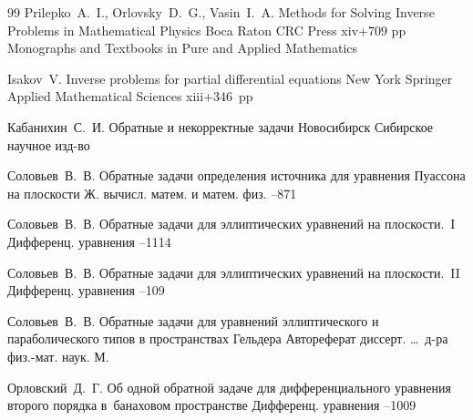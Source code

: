 \begin{thebibliography}{99}
\by  Prilepko~A.~I., Orlovsky~D.~G., Vasin~I.~A.
\book Methods for Solving Inverse Problems in Mathematical Physics
\publaddr Boca Raton 
\publ  CRC Press 
\totalpages xiv+709 pp \nofrills
\serial Monographs and Textbooks in Pure and Applied Mathematics

\by Isakov~V. 
\book Inverse problems for partial differential equations
\publaddr New York
\publ Springer
\serial Applied Mathematical Sciences
\totalpages xiii+346~pp \nofrills

\by Кабанихин~С.~И.
\book Обратные и некорректные задачи
\publaddr Новосибирск
\publ Сибирское научное изд-во

\by Соловьев~В.~В. 
\paper Обратные задачи определения источника для уравнения Пуассона на плоскости
\jour Ж. вычисл. матем. и матем. физ.
--871

\by Соловьев~В.~В. 
\paper Обратные задачи для эллиптических уравнений на плоскости.~I
\jour Дифференц. уравнения
--1114

\by Соловьев~В.~В. 
\paper Обратные задачи для эллиптических уравнений на плоскости.~II
\jour Дифференц. уравнения
–109

\by Соловьев~В.~В.
\thesis Обратные задачи для уравнений эллиптического и параболического типов в пространствах Гельдера
\thesisinfo Автореферат диссерт. \dots\ д-ра физ.-мат. наук. 
\publaddr М.

\by Орловский~Д.~Г.
\paper Об одной обратной задаче для дифференциального уравнения второго порядка в~банаховом пространстве
\jour Дифференц. уравнения
--1009


\end{thebibliography}

